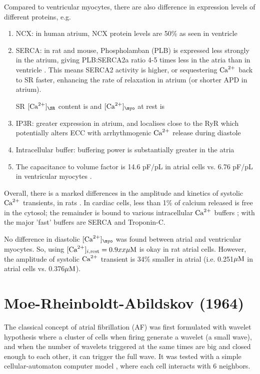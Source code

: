 Compared to ventricular myocytes, there are also difference in expression levels
of different proteins, e.g.
\begin{enumerate}
  \item NCX: in human atrium, NCX protein levels are 50\% as seen in ventricle
  \citep{wang1996}
  \item SERCA: in rat and mouse, Phospholamban (PLB) is expressed less
  strongly in the atrium, giving PLB:SERCA2a ratio 4-5 times
  less in the atria than in ventricle \citep{koss1997, freestone2000}.
  This means SERCA2 activity is higher, or sequestering ${\text{Ca}^{2+}}$ back
  to SR faster, enhancing the rate of relaxation in atrium (or shorter APD in
  atrium).

  SR $[\Ca]_\SR$ content is  
  and $[\Ca]_\myo$ at rest is 
  
    
  \item IP3R: greater expression in atrium, and localises close to the RyR
  which potentially alters ECC with arrhythmogenic ${\text{Ca}^{2+}}$ release
  during diastole \citep{lipp2000, mackenzie2002}
  
  \item Intracellular buffer: buffering power is substantially greater in the
  atria
  
  \item The capacitance to volume factor is 14.6 pF/pL in atrial cells
  \citep{walden2009} vs. 6.76 pF/pL in ventricular myocytes \citep{satoh1996svr}.
\end{enumerate}
Overall, there is a marked differences in the amplitude and kinetics of systolic
${\text{Ca}^{2+}}$ transients, in rats \citep{walden2009}.
In cardiac cells, less than 1\% of calcium released is free in the cytosol; the
remainder is bound to various intracellular ${\text{Ca}^{2+}}$ buffers \citep{berlin1994iccb,
trafford1999nrr}; with the major 'fast' buffers are SERCA and Troponin-C. 
  

No difference in diastolic $[\Ca]_\myo$ was found between atrial and ventricular
myocytes. So, using $[{\text{Ca}^{2+}}]_{i,{\text{rest}}}=0.9xx {\mu\text{M}}$ is okay in rat atrial cells.
However, the amplitude of systolic ${\text{Ca}^{2+}}$ transient is 34\% smaller in atrial
(i.e. 0.251${\mu\text{M}}$ in atrial cells vs. 0.376${\mu\text{M}}$).

\section{Moe-Rheinboldt-Abildskov (1964)}

The classical concept of atrial fibrillation (AF) was first formulated with
wavelet hypothesis where a cluster of cells when firing generate a wavelet (a
small wave), and when the number of wavelets triggered at the same times are big
and closed enough to each other, it can trigger the full wave. It was tested
with a simple cellular-automaton computer model \citep{moe1964}, where each
cell interacts with 6 neighbors.

